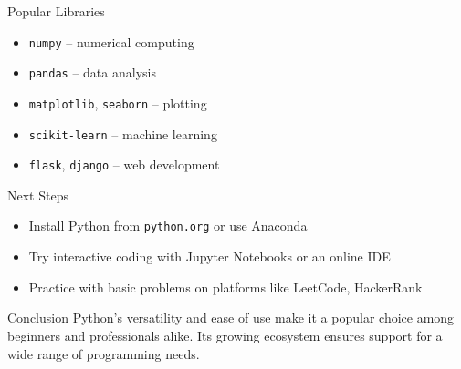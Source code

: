 \begin{frame}{Popular Libraries}
\begin{itemize}
    \item \texttt{numpy} – numerical computing
    \item \texttt{pandas} – data analysis
    \item \texttt{matplotlib}, \texttt{seaborn} – plotting
    \item \texttt{scikit-learn} – machine learning
    \item \texttt{flask}, \texttt{django} – web development
\end{itemize}
\end{frame}


\begin{frame}{Next Steps}
\begin{itemize}
    \item Install Python from \texttt{python.org} or use Anaconda
    \item Try interactive coding with Jupyter Notebooks or an online IDE
    \item Practice with basic problems on platforms like LeetCode, HackerRank
\end{itemize}
\end{frame}

\begin{frame}{Conclusion}
Python's versatility and ease of use make it a popular choice among beginners and professionals alike. Its growing ecosystem ensures support for a wide range of programming needs.
\end{frame}
